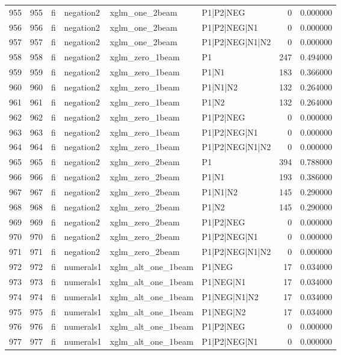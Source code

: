 \begin{tabular}{lrllllrr}
955 & 955 & fi & negation2 & xglm_one_2beam & P1|P2|NEG & 0 & 0.000000 \\
956 & 956 & fi & negation2 & xglm_one_2beam & P1|P2|NEG|N1 & 0 & 0.000000 \\
957 & 957 & fi & negation2 & xglm_one_2beam & P1|P2|NEG|N1|N2 & 0 & 0.000000 \\
958 & 958 & fi & negation2 & xglm_zero_1beam & P1 & 247 & 0.494000 \\
959 & 959 & fi & negation2 & xglm_zero_1beam & P1|N1 & 183 & 0.366000 \\
960 & 960 & fi & negation2 & xglm_zero_1beam & P1|N1|N2 & 132 & 0.264000 \\
961 & 961 & fi & negation2 & xglm_zero_1beam & P1|N2 & 132 & 0.264000 \\
962 & 962 & fi & negation2 & xglm_zero_1beam & P1|P2|NEG & 0 & 0.000000 \\
963 & 963 & fi & negation2 & xglm_zero_1beam & P1|P2|NEG|N1 & 0 & 0.000000 \\
964 & 964 & fi & negation2 & xglm_zero_1beam & P1|P2|NEG|N1|N2 & 0 & 0.000000 \\
965 & 965 & fi & negation2 & xglm_zero_2beam & P1 & 394 & 0.788000 \\
966 & 966 & fi & negation2 & xglm_zero_2beam & P1|N1 & 193 & 0.386000 \\
967 & 967 & fi & negation2 & xglm_zero_2beam & P1|N1|N2 & 145 & 0.290000 \\
968 & 968 & fi & negation2 & xglm_zero_2beam & P1|N2 & 145 & 0.290000 \\
969 & 969 & fi & negation2 & xglm_zero_2beam & P1|P2|NEG & 0 & 0.000000 \\
970 & 970 & fi & negation2 & xglm_zero_2beam & P1|P2|NEG|N1 & 0 & 0.000000 \\
971 & 971 & fi & negation2 & xglm_zero_2beam & P1|P2|NEG|N1|N2 & 0 & 0.000000 \\
972 & 972 & fi & numerals1 & xglm_alt_one_1beam & P1|NEG & 17 & 0.034000 \\
973 & 973 & fi & numerals1 & xglm_alt_one_1beam & P1|NEG|N1 & 17 & 0.034000 \\
974 & 974 & fi & numerals1 & xglm_alt_one_1beam & P1|NEG|N1|N2 & 17 & 0.034000 \\
975 & 975 & fi & numerals1 & xglm_alt_one_1beam & P1|NEG|N2 & 17 & 0.034000 \\
976 & 976 & fi & numerals1 & xglm_alt_one_1beam & P1|P2|NEG & 0 & 0.000000 \\
977 & 977 & fi & numerals1 & xglm_alt_one_1beam & P1|P2|NEG|N1 & 0 & 0.000000 \\

\end{tabular}
